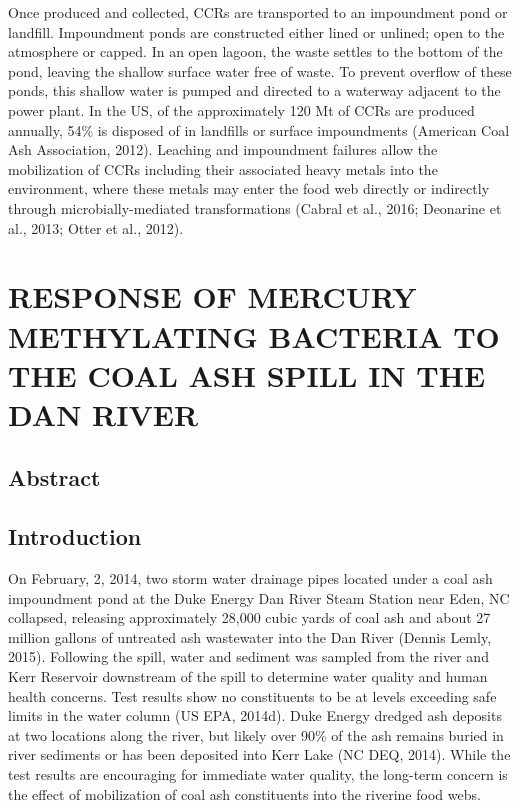 \documentclass[ms]{uncgdissertationexp}
\theoremstyle{plain}
\theoremstyle{definition}
\theoremstyle{remark}
\begin{document}
  Once produced and collected, CCRs are transported to an impoundment pond
  or landfill. Impoundment ponds are constructed either lined or unlined;
  open to the atmosphere or capped. In an open lagoon, the waste settles
  to the bottom of the pond, leaving the shallow surface water free of
  waste. To prevent overflow of these ponds, this shallow water is pumped
  and directed to a waterway adjacent to the power plant. In the US, of
  the approximately 120 Mt of CCRs are produced annually, 54\% is disposed
  of in landfills or surface impoundments (American Coal Ash Association,
  2012). Leaching and impoundment failures allow the mobilization of CCRs
  including their associated heavy metals into the environment, where
  these metals may enter the food web directly or indirectly through
  microbially-mediated transformations (Cabral et al., 2016; Deonarine et
  al., 2013; Otter et al., 2012).
  
  \chapter{RESPONSE OF MERCURY METHYLATING BACTERIA TO THE COAL ASH SPILL
  IN THE DAN RIVER}\label{pcr}
  
  \section{Abstract}\label{abstract}
  
  \section{Introduction}\label{introduction}
  
  On February, 2, 2014, two storm water drainage pipes located under a
  coal ash impoundment pond at the Duke Energy Dan River Steam Station
  near Eden, NC collapsed, releasing approximately 28,000 cubic yards of
  coal ash and about 27 million gallons of untreated ash wastewater into
  the Dan River (Dennis Lemly, 2015). Following the spill, water and
  sediment was sampled from the river and Kerr Reservoir downstream of the
  spill to determine water quality and human health concerns. Test results
  show no constituents to be at levels exceeding safe limits in the water
  column (US EPA, 2014d). Duke Energy dredged ash deposits at two
  locations along the river, but likely over 90\% of the ash remains
  buried in river sediments or has been deposited into Kerr Lake (NC DEQ,
  2014). While the test results are encouraging for immediate water
  quality, the long-term concern is the effect of mobilization of coal ash
  constituents into the riverine food webs.
  
\end{document}
